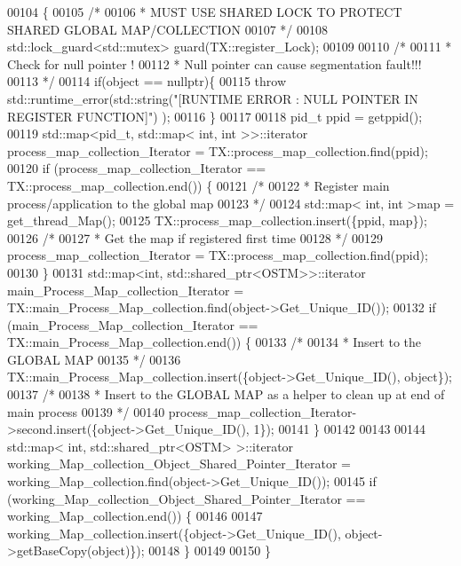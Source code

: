 \begin{DoxyCode}
00104                                              \{
00105     \textcolor{comment}{/*}
00106 \textcolor{comment}{     * MUST USE SHARED LOCK TO PROTECT SHARED GLOBAL MAP/COLLECTION 
}
00107 \textcolor{comment}{     */}
00108     std::lock\_guard<std::mutex> guard(TX::register\_Lock);
00109     
00110     \textcolor{comment}{/*}
00111 \textcolor{comment}{     * Check for null pointer !
}
00112 \textcolor{comment}{     * Null pointer can cause segmentation fault!!!
}
00113 \textcolor{comment}{     */}
00114     \textcolor{keywordflow}{if}(\textcolor{keywordtype}{object} == \textcolor{keyword}{nullptr})\{
00115         \textcolor{keywordflow}{throw} std::runtime\_error(std::string(\textcolor{stringliteral}{"[RUNTIME ERROR : NULL POINTER IN REGISTER FUNCTION]"}) );
00116     \}
00117     
00118     pid\_t ppid = getppid();
00119     std::map<pid\_t, std::map< int, int >>::iterator process\_map\_collection\_Iterator = 
      TX::process\_map\_collection.find(ppid);
00120     \textcolor{keywordflow}{if} (process\_map\_collection\_Iterator == TX::process\_map\_collection.end()) \{
00121         \textcolor{comment}{/*}
00122 \textcolor{comment}{         * Register main process/application to the global map
}
00123 \textcolor{comment}{         */}
00124         std::map< int, int >map =  get\_thread\_Map();
00125         TX::process\_map\_collection.insert(\{ppid, map\});
00126         \textcolor{comment}{/*}
00127 \textcolor{comment}{         * Get the map if registered first time
}
00128 \textcolor{comment}{         */}
00129         process\_map\_collection\_Iterator = TX::process\_map\_collection.find(ppid);
00130     \}
00131     std::map<int, std::shared\_ptr<OSTM>>::iterator main\_Process\_Map\_collection\_Iterator = 
      TX::main\_Process\_Map\_collection.find(object->Get\_Unique\_ID());
00132     \textcolor{keywordflow}{if} (main\_Process\_Map\_collection\_Iterator == TX::main\_Process\_Map\_collection.end()) \{
00133         \textcolor{comment}{/*}
00134 \textcolor{comment}{         * Insert to the GLOBAL MAP 
}
00135 \textcolor{comment}{         */}
00136         TX::main\_Process\_Map\_collection.insert(\{\textcolor{keywordtype}{object}->Get\_Unique\_ID(), \textcolor{keywordtype}{object}\});
00137         \textcolor{comment}{/*}
00138 \textcolor{comment}{         * Insert to the GLOBAL MAP as a helper to clean up at end of main process 
}
00139 \textcolor{comment}{         */}
00140         process\_map\_collection\_Iterator->second.insert(\{\textcolor{keywordtype}{object}->Get\_Unique\_ID(), 1\});
00141     \} 
00142 
00143 
00144     std::map< int, std::shared\_ptr<OSTM> >::iterator working\_Map\_collection\_Object\_Shared\_Pointer\_Iterator 
      = working\_Map\_collection.find(object->Get\_Unique\_ID());
00145     \textcolor{keywordflow}{if} (working\_Map\_collection\_Object\_Shared\_Pointer\_Iterator == working\_Map\_collection.end()) \{
00146 
00147         working\_Map\_collection.insert(\{\textcolor{keywordtype}{object}->Get\_Unique\_ID(), \textcolor{keywordtype}{object}->getBaseCopy(\textcolor{keywordtype}{object})\});
00148     \}
00149 
00150 \}
\end{DoxyCode}
